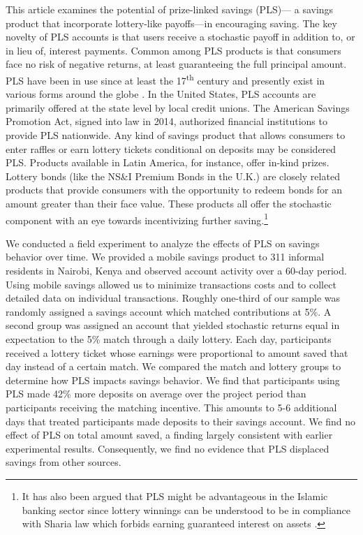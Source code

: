\documentclass[11pt]{article}
\begin{document}
	This article examines the potential of prize-linked savings (PLS)--- a savings product that incorporate lottery-like payoffs---in encouraging saving. The key novelty of PLS accounts is that users receive a stochastic payoff in addition to, or in lieu of, interest payments. Common among PLS products is that consumers face no risk of negative returns, at least guaranteeing the full principal amount. PLS have been in use since at least the 17\textsuperscript{th} century and presently exist in various forms around the globe \parencite{murphy_lotteries_2005,kearney_making_2010}. In the United States, PLS accounts are primarily offered at the state level by local credit unions. The American Savings Promotion Act, signed into law in 2014, authorized financial institutions to provide PLS nationwide. Any kind of savings product that allows consumers to enter raffles or earn lottery tickets conditional on deposits may be considered PLS. Products available in Latin America, for instance, offer in-kind prizes. Lottery bonds (like the NS\&I Premium Bonds in the U.K.) are closely related products that provide consumers with the opportunity to redeem bonds for an amount greater than their face value. These products all offer the stochastic component with an eye towards incentivizing further saving.\footnote{It has also been argued that PLS might be advantageous in the Islamic banking sector since lottery winnings can be understood to be in compliance with Sharia law which forbids earning guaranteed interest on assets \parencite{ruth_how_2018}.}

	We conducted a field experiment to analyze the effects of PLS on savings behavior over time. We provided a mobile savings product to 311 informal residents in Nairobi, Kenya and observed account activity over a 60-day period. Using mobile savings allowed us to minimize transactions costs and to collect detailed data on individual transactions. Roughly one-third of our sample was randomly assigned a savings account which matched contributions at 5\%. A second group was assigned an account that yielded stochastic returns equal in expectation to the 5\% match through a daily lottery. Each day, participants received a lottery ticket whose earnings were proportional to amount saved that day instead of a certain match. We compared the match and lottery groups to determine how PLS impacts savings behavior. We find that participants using PLS made 42\% more deposits on average over the project period than participants receiving the matching incentive. This amounts to 5-6 additional days that treated participants made deposits to their savings account. We find no effect of PLS on total amount saved, a finding largely consistent with earlier experimental results. Consequently, we find no evidence that PLS displaced savings from other sources. 
\end{document}
